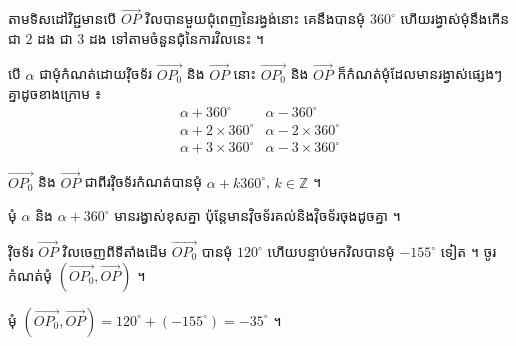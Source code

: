 \begin{example}[ឧទាហរណ៍ ២]
តាមទិសដៅវិជ្ជមានបើ $\overrightarrow{OP}$ វិលបានមួយជុំពេញនៃរង្វង់នោះ គេនឹងបានមុំ $360^\circ$ ហើយរង្វាស់មុំនឹងកើនជា $2$ ដង ជា $3$ ដង ទៅតាមចំនួនជុំនៃការវិលនេះ ។
\begin{center}
\end{center}
\end{example}

បើ $\alpha$ ជាមុំកំណត់ដោយវ៉ិចទ័រ $\overrightarrow{OP_0}$ និង $\overrightarrow{OP}$ នោះ $\overrightarrow{OP_0}$ និង $\overrightarrow{OP}$ ក៏កំណត់មុំដែលមានរង្វាស់ផ្សេងៗគ្នាដូចខាងក្រោម ៖
\[
\begin{array}{ll}
\alpha + 360^\circ & \alpha - 360^\circ\\
\alpha + 2 \times 360^\circ & \alpha - 2 \times 360^\circ\\
\alpha + 3 \times 360^\circ & \alpha - 3 \times 360^\circ
\end{array}
\]

\begin{formulaBox}[ជាទូទៅ]
$\overrightarrow{OP_0}$ និង $\overrightarrow{OP}$ ជាពីរវ៉ិចទ័រកំណត់បានមុំ $\alpha + k360^\circ$, $k \in \mathbb{Z}$ ។
\end{formulaBox}

\begin{note}[សម្គាល់]
មុំ $\alpha$ និង $\alpha + 360^\circ$ មានរង្វាស់ខុសគ្នា ប៉ុន្តែមានវ៉ិចទ័រគល់និងវ៉ិចទ័រចុងដូចគ្នា ។
\end{note}

\begin{example}[លំហាត់គំរូ ១]
វ៉ិចទ័រ $\overrightarrow{OP}$ វិលចេញពីទីតាំងដើម $\overrightarrow{OP_0}$ បានមុំ $120^\circ$ ហើយបន្ទាប់មកវិលបានមុំ $-155^\circ$ ទៀត ។ ចូរកំណត់មុំ $(\overrightarrow{OP_0}, \overrightarrow{OP})$ ។
\end{example}
\ans
មុំ $(\overrightarrow{OP_0}, \overrightarrow{OP}) = 120^\circ + (-155^\circ) = -35^\circ$ ។

